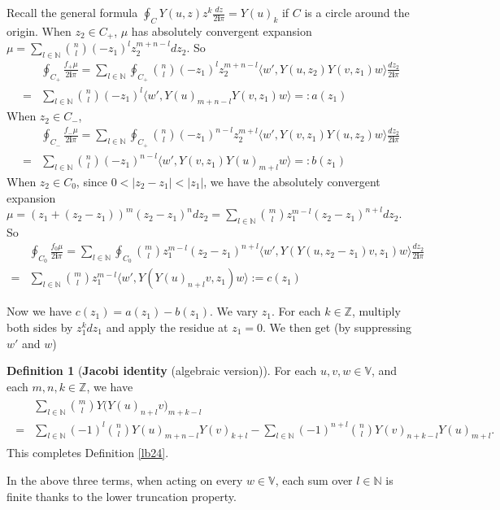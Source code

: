 \documentclass[11pt,b5paper,notitlepage]{article}
\theoremstyle{definition}
\newtheorem{df}{Definition}[section]
\theoremstyle{plain}
\newcommand{\bk}[1]{\langle {#1}\rangle}
\newcommand{\im}{\mathbf{i}}
\newcommand{\Vbb}{\mathbb V}
\newcommand{\Nbb}{\mathbb N}
\newcommand{\Zbb}{\mathbb Z}
\numberwithin{equation}{section}
\begin{document}
Recall the general formula $\oint_C Y(u,z)z^k\frac {dz}{2\im\pi}=Y(u)_k$ if $C$ is a circle around the origin. When $z_2\in C_+$, $\mu$ has absolutely convergent expansion $\mu=\sum_{l\in\Nbb}{n\choose l}(-z_1)^lz_2^{m+n-l}dz_2$. So
\begin{align*}
&\oint_{C_+}\frac{f_+\mu}{2\im\pi}=\sum_{l\in\Nbb}	\oint_{C_+}{n\choose l}(-z_1)^lz_2^{m+n-l}\bk{w',Y(u,z_2)Y(v,z_1)w}\frac{dz_2}{2\im\pi}\\
=&\sum_{l\in\Nbb} {n\choose l}(-z_1)^l\bk{w',Y(u)_{m+n-l}Y(v,z_1)w}=:a(z_1)
\end{align*}
When $z_2\in C_-$, 
\begin{align*}
	&\oint_{C_-}\frac{f_-\mu}{2\im\pi}=\sum_{l\in\Nbb}	\oint_{C_+}{n\choose l}(-z_1)^{n-l}z_2^{m+l}\bk{w',Y(v,z_1)Y(u,z_2)w}\frac{dz_2}{2\im\pi}\\
	=&\sum_{l\in\Nbb}{n\choose l}(-z_1)^{n-l}\bk{w',Y(v,z_1)Y(u)_{m+l}w}=:b(z_1)
\end{align*}
When $z_2\in C_0$, since $0<|z_2-z_1|<|z_1|$, we have the absolutely convergent expansion $\mu=(z_1+(z_2-z_1))^m(z_2-z_1)^ndz_2=\sum_{l\in\Nbb}{m\choose l}z_1^{m-l}(z_2-z_1)^{n+l}dz_2$. So
\begin{align*}
&\oint_{C_0}\frac{f_0\mu}{2\im\pi}=\sum_{l\in\Nbb}\oint_{C_0}{m\choose l}z_1^{m-l}(z_2-z_1)^{n+l}\bk{w',Y(Y(u,z_2-z_1)v,z_1)w}\frac{dz_2}{2\im\pi}\\
=&\sum_{l\in\Nbb}{m\choose l}z_1^{m-l}\bk{w',Y(Y(u)_{n+l}v,z_1)w}:=c(z_1)
\end{align*}

Now we have $c(z_1)=a(z_1)-b(z_1)$. We vary $z_1$. For each $k\in\Zbb$, multiply both sides by $z_1^kdz_1$ and apply the residue at $z_1=0$. We then get (by suppressing $w'$ and $w$)

\begin{df}[\textbf{Jacobi identity} (algebraic version)]\label{lb36} 
For each $u,v,w\in\Vbb$, and each $m,n,k\in\Zbb$, we have
\begin{align}\label{eq47}
	\begin{aligned}
&\sum_{l\in\Nbb}{m\choose l}Y\big(Y(u)_{n+l}v\big)_{m+k-l}\\
=&\sum_{l\in\Nbb}(-1)^l{n\choose l}Y(u)_{m+n-l}Y(v)_{k+l}-\sum_{l\in\Nbb}(-1)^{n+l}{n\choose l}Y(v)_{n+k-l} Y(u)_{m+l}	.
	\end{aligned}
\end{align}
This completes Definition \ref{lb24}.
\end{df}
In the above three terms, when acting on every $w\in\Vbb$, each sum over $l\in\Nbb$ is finite thanks to the lower truncation property.
\end{document}
